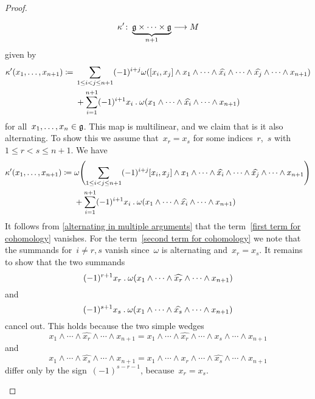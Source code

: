 \begin{proof}
\begin{enumerate}
			\[
				\kappa'
				\colon
				\underbrace{ \glie \times \dotsb \times \glie }_{n+1}
				\to
				M
			\]
			given by
			\begin{align*}
				\kappa'(x_1, \dotsc, x_{n+1})
				\coloneqq
				{}&
				\sum_{1 \leq i < j \leq n+1}
				(-1)^{i+j}
				\omega
				(
					[x_i, x_j] \wedge x_1 \wedge \dotsb \wedge \widehat{x_i} \wedge \dotsb \wedge \widehat{x_j} \wedge \dotsb \wedge x_{n+1}
				)
				\\
				{}&
				+
				\sum_{i=1}^{n+1}
				(-1)^{i+1}
				x_i \mathbin{.} \omega(x_1 \wedge \dotsb \wedge \widehat{x_i} \wedge \dotsb \wedge x_{n+1})
			\end{align*}
			for all~$x_1, \dotsc, x_n \in \mathfrak{g}$.
			This map is multilinear, and we claim that is it also alternating.
			To show this we assume that~$x_r = x_s$ for some indices~$r$,~$s$ with~$1 \leq r < s \leq n+1$.
			We have
			\begin{align}
				\kappa'(x_1, \dotsc, x_{n+1})
				\coloneqq
				{}&
				\omega
				\Biggl(
					\sum_{1 \leq i < j \leq n+1}
					(-1)^{i+j}
					[x_i, x_j] \wedge x_1 \wedge \dotsb \wedge \widehat{x_i} \wedge \dotsb \wedge \widehat{x_j} \wedge \dotsb \wedge x_{n+1}
				\Biggr)
				\label{first term for cohomology}
				\\
				{}&
				+
				\sum_{i=1}^{n+1}
				(-1)^{i+1}
				x_i \mathbin{.} \omega(x_1 \wedge \dotsb \wedge \widehat{x_i} \wedge \dotsb \wedge x_{n+1})
				\label{second term for cohomology}
			\end{align}
			It follows from \cref{alternating in multiple arguments} that the term~\eqref{first term for cohomology} vanishes.
			For the term~\eqref{second term for cohomology} we note that the summands for~$i \neq r,s$ vanish since~$\omega$ is alternating and~$x_r = x_s$.
			It remains to show that the two summands
			\[
				(-1)^{r+1}
				x_r \mathbin{.} \omega(x_1 \wedge \dotsb \wedge \widehat{x_r} \wedge \dotsb \wedge x_{n+1})
			\]
			and
			\[
				(-1)^{s+1}
				x_s \mathbin{.} \omega(x_1 \wedge \dotsb \wedge \widehat{x_s} \wedge \dotsb \wedge x_{n+1})
			\]
			cancel out.
			This holds because the two simple wedges
			\[
				x_1 \wedge \dotsb \wedge \widehat{x_r} \wedge \dotsb \wedge x_{n+1}
				=
				x_1 \wedge \dotsb \wedge \widehat{x_r} \wedge \dotsb \wedge x_s \wedge \dotsb \wedge x_{n+1}
			\]
			and
			\[
				x_1 \wedge \dotsb \wedge \widehat{x_s} \wedge \dotsb \wedge x_{n+1}
				=
				x_1 \wedge \dotsb \wedge x_r \wedge \dotsb \wedge \widehat{x_s} \wedge \dotsb \wedge x_{n+1}
			\]
			differ only by the sign~$(-1)^{s-r-1}$, because~$x_r = x_s$.


\end{enumerate}
\end{proof}
